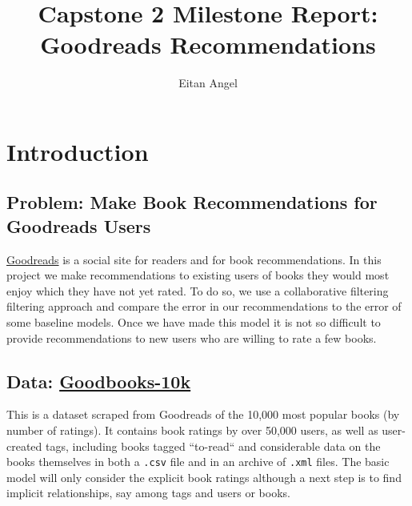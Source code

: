 \documentclass[11pt]{article}
\title{Capstone 2 Milestone Report: Goodreads Recommendations}
\author{Eitan Angel}
\begin{document}
    	
    
    \maketitle
 
\tableofcontents

\listoffigures 

\listoftables
 
 \newpage
 
     \hypertarget{introduction}{%
\section{Introduction}\label{introduction}}

    \hypertarget{problem}{%
\subsection{Problem: Make Book Recommendations for Goodreads Users}\label{problem}}

\href{https://www.goodreads.com}{Goodreads} is a social site for readers and for book recommendations. In this project we make recommendations to existing users of books they would most enjoy which they have not yet rated. To do so, we use a collaborative filtering filtering approach and compare the error in our recommendations to the error of some baseline models. Once we have made this model it is not so difficult to provide recommendations to new users who are willing to rate a few books. 

    \hypertarget{data}{%
\subsection{Data: \href{https://github.com/zygmuntz/goodbooks-10k}{Goodbooks-10k}}\label{data}}

This is a dataset scraped from Goodreads of the 10,000 most popular books (by number of ratings). It contains book ratings by over 50,000 users, as well as user-created tags, including books tagged ``to-read`` and considerable data on the books themselves in both a \texttt{.csv} file and in an archive of \texttt{.xml} files. The basic model will only consider the explicit book ratings although a next step is to find implicit relationships, say among tags and users or books.
    
\end{document}
